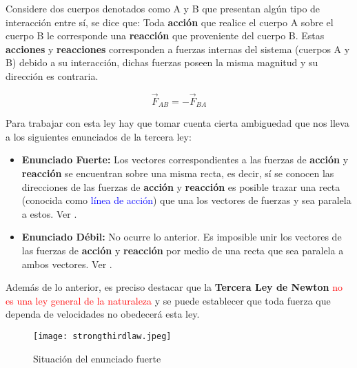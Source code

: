 \documentclass[/home/hernan/Documentos/Apuntes_mecanica_teorica/main.tex]{subfiles}
\begin{document}
	\begin{definition}
		Considere dos cuerpos denotados como A y B que presentan algún tipo de interacción entre sí, se dice que:
		Toda \textbf{acción} que realice el cuerpo A sobre el cuerpo B le corresponde una \textbf{reacción} que proveniente del cuerpo B. Estas \textbf{acciones} y \textbf{reacciones} corresponden a fuerzas internas del sistema (cuerpos A y B) debido a su interacción, dichas fuerzas poseen la misma magnitud y su dirección es contraria.
		
		\begin{equation}
			\vec{F}_{AB} = - \vec{F}_{BA}
			\label{eq: NThirdlaw}
		\end{equation}

		Para trabajar con esta ley hay que tomar cuenta cierta ambiguedad que nos lleva a los siguientes enunciados de la tercera ley:
		\begin{itemize}
			\item \textbf{Enunciado Fuerte: } Los vectores correspondientes a las fuerzas de \textbf{acción} y \textbf{reacción} se encuentran sobre una misma recta, es decir, sí se conocen las direcciones de las fuerzas de \textbf{acción} y \textbf{reacción} es posible trazar una recta (conocida como \textcolor{blue}{línea de acción}) que una los vectores de fuerzas y sea paralela a estos. Ver .
			\item \textbf{Enunciado Débil: } No ocurre lo anterior. Es imposible unir los vectores de las fuerzas de \textbf{acción} y \textbf{reacción} por medio de una recta que sea paralela a ambos vectores. Ver .
		\end{itemize}

		Además de lo anterior, es preciso destacar que la \textbf{Tercera Ley de Newton} \textcolor{red}{no es una ley general de la naturaleza} y se puede establecer que toda fuerza que dependa de velocidades no obedecerá esta ley.
	\end{definition}

	\begin{marginfigure}
		\begin{figure}[H]
			\centering
			\texttt{[image: strongthirdlaw.jpeg]}
			\caption{Situación del enunciado fuerte}
			\label{fig: Nthirdstrong}
		\end{figure}
	\end{marginfigure}
\end{document}
